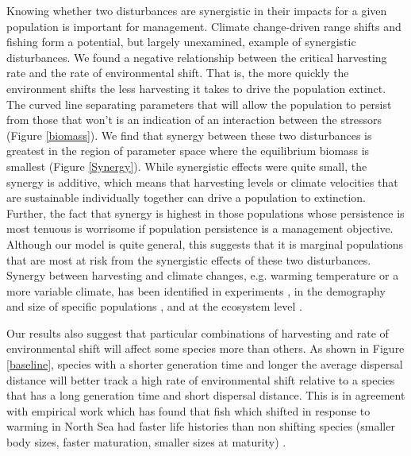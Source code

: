 \documentclass[12pt,english]{article}
\begin{document}
Knowing whether two disturbances are synergistic in their impacts for a given population is important for management. Climate change-driven range shifts and fishing form a potential, but largely unexamined, example of synergistic disturbances. We found a negative relationship between the critical harvesting rate and the rate of environmental shift.  That is, the more quickly the environment shifts the less harvesting it takes to drive the population extinct. The curved line separating parameters that will allow the population to persist from those that won't is an indication of an interaction between the stressors (Figure \ref{biomass}). We find that synergy between these two disturbances is greatest in the region of parameter space where the equilibrium biomass is smallest (Figure \ref{Synergy}). While synergistic effects were quite small, the synergy is additive, which means that harvesting levels or climate velocities that are sustainable individually together can drive a population to extinction. Further, the fact that synergy is highest in those populations whose persistence is most tenuous is worrisome if population persistence is a management objective. Although our model is quite general, this suggests that it is marginal populations that are most at risk from the synergistic effects of these two disturbances. 
Synergy between harvesting and climate changes, e.g. warming temperature or a more variable climate, has been identified in experiments \citep{Moraetal2007}, in the demography and size of specific populations \citep{Planque:2010uq}, and at the ecosystem level \citep{Kirby:2009fk}. 

Our results also suggest that particular combinations of harvesting and rate of environmental shift will affect some species more than others. As shown in Figure \ref{baseline}, species with a shorter generation time and longer the average dispersal distance will better track a high rate of environmental shift relative to a species that has a long generation time and short dispersal distance. This is in agreement with empirical work which has found that fish which shifted in response to warming in North Sea had faster life histories than non shifting species (smaller body sizes, faster maturation, smaller sizes at maturity) \citep{Perryetal2005}. 
\end{document}

